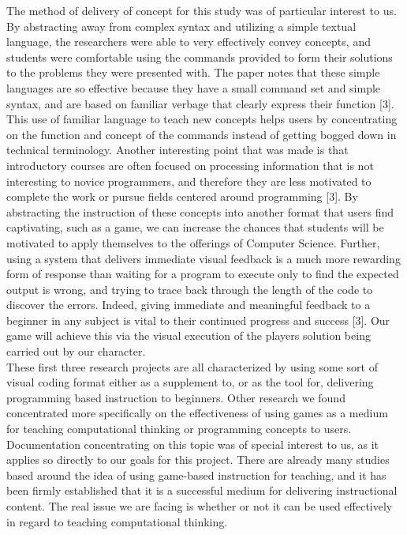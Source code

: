 The method of delivery of concept for this study was of particular interest to us. By 
abstracting away from complex syntax and utilizing a simple textual language, the 
researchers were able to very effectively convey concepts, and students were 
comfortable using the commands provided to form their solutions to the problems 
they were presented with. The paper notes that these simple languages are so effective 
because they have a small command set and simple syntax, and are based on familiar 
verbage that clearly express their function [3]. This use of familiar language to teach 
new concepts helps users by concentrating on the function and concept of the 
commands instead of getting bogged down in technical terminology. Another interesting 
point that was made is that introductory courses are often focused on processing 
information that is not interesting to novice programmers, and therefore they are 
less motivated to complete the work or pursue fields centered around programming [3]. 
By abstracting the instruction of these concepts into another format that users find 
captivating, such as a game, we can increase the chances that students will be motivated 
to apply themselves to the offerings of Computer Science. Further, using a system that 
delivers immediate visual feedback is a much more rewarding form of response than 
waiting for a program to execute only to find the expected output is wrong, and trying 
to trace back through the length of the code to discover the errors. Indeed, giving 
immediate and meaningful feedback to a beginner in any subject is vital to their 
continued progress and success [3]. Our game will achieve this via the visual execution 
of the players solution being carried out by our character. \\

These first three research projects are all characterized by using some sort of visual 
coding format either as a supplement to, or as the tool for, delivering programming 
based instruction to beginners. Other research we found concentrated more specifically 
on the effectiveness of using games as a medium for teaching computational thinking 
or programming concepts to users. Documentation concentrating on this topic was of 
special interest to us, as it applies so directly to our goals for this project. There are 
already many studies based around the idea of using game-based instruction for teaching, 
and it has been firmly established that it is a successful medium for delivering instructional 
content. The real issue we are facing is whether or not it can be used effectively in regard 
to teaching computational thinking.\\

